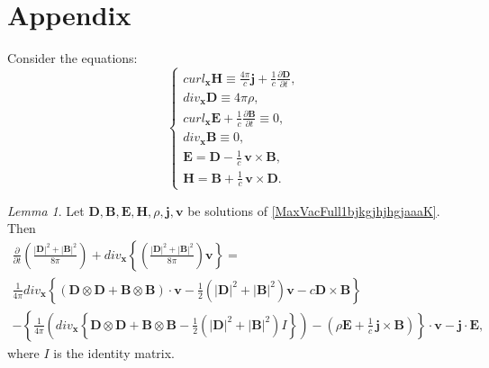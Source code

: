 \documentclass{article}
\newtheorem{lemma}{Lemma}[section]
\theoremstyle{definition}
\theoremstyle{remark}
\renewcommand{\vec}[1]{\mathbf{#1}}
\newcommand{\R}{\mathbb{R}}
\newcommand{\er}{\eqref}
\newcommand{\R}{{\mathbb{R}}}
\newcommand{\er}{\eqref}
\newtheorem{lemma}{Lemma}
\begin{document}
\section{Appendix}
Consider the equations:
\begin{equation}\label{MaxVacFull1bjkgjhjhgjaaaK}
\begin{cases}
curl_{\vec x} \vec H\equiv \frac{4\pi}{c}\vec
j+\frac{1}{c}\frac{\partial
\vec D}{\partial t},\\
div_{\vec x} \vec D\equiv 4\pi\rho,\\
curl_{\vec x} \vec E+\frac{1}{c}\frac{\partial \vec B}{\partial t}\equiv 0,\\
div_{\vec x} \vec B\equiv 0,\\
\vec E=\vec D-\frac{1}{c}\,\vec v\times \vec B,\\
\vec H=\vec B+\frac{1}{c}\,\vec v\times \vec D.
\end{cases}
\end{equation}
\begin{lemma}\label{fgbfghfh}
Let $\vec D,\vec B,\vec E,\vec H,\rho,\vec j,\vec v$ be solutions of
\er{MaxVacFull1bjkgjhjhgjaaaK}. Then
\begin{multline}\label{hvkgkjgkjbjbbklnknhihiokh}
\frac{\partial}{\partial t}\left(\frac{|\vec D|^2+|\vec
B|^2}{8\pi}\right)+div_\vec x\left\{\left(\frac{|\vec D|^2+|\vec
B|^2}{8\pi}\right)\vec v\right\}=\\ \frac{1}{4\pi}div_\vec
x\left\{(\vec D\otimes \vec D+ \vec B\otimes \vec B)\cdot \vec
v-\frac{1}{2}\left(|\vec D|^2+|\vec B|^2\right)\vec v-c \vec D\times
\vec B\right\}
\\-\left\{\frac{1}{4\pi}\left(div_\vec x\left\{\vec D\otimes \vec D+\vec B\otimes
\vec B-\frac{1}{2}\left(|\vec D|^2+|\vec
B|^2\right)I\right\}\right)-\left(\rho \vec E+\frac{1}{c}\,\vec
j\times \vec B\right)\right\}\cdot \vec v-\vec j\cdot \vec E,
\end{multline}
where $I$ is the identity matrix.
\end{lemma}
\end{document}
